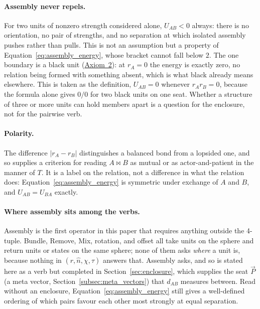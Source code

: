 \documentclass[12pt, a4paper]{article}
\begin{document}
\paragraph{Assembly never repels.}
For two units of nonzero strength considered alone, $U_{AB}<0$
always: there is no orientation, no pair of strengths, and no
separation at which isolated assembly pushes rather than pulls. This
is not an assumption but a property of
Equation~\eqref{eq:assembly_energy}, whose bracket cannot fall below
$2$. The one boundary is a black unit
(\hyperref[subsec:axiom_null]{Axiom~2}): at $r_A=0$ the energy is exactly
zero, no relation being formed with something absent, which is what
black already means elsewhere. This is taken as the definition,
$U_{AB}=0$ whenever $r_Ar_B=0$, because the formula alone gives $0/0$
for two black units on one seat. Whether a structure of three or more
units can hold members apart is a question for the enclosure, not
for the pairwise verb.

\paragraph{Polarity.}
The difference $\lvert r_A - r_B\rvert$ distinguishes a balanced bond
from a lopsided one, and so supplies a criterion for reading
$A\bowtie B$ as mutual or as actor-and-patient in the manner of $T$.
It is a label on the relation, not a difference in what the relation
does: Equation~\eqref{eq:assembly_energy} is symmetric under exchange
of $A$ and $B$, and $U_{AB}=U_{BA}$ exactly.

\paragraph{Where assembly sits among the verbs.}
Assembly is the first operator in this paper that requires anything
outside the 4-tuple. Bundle, Remove, Mix, rotation, and offset all
take units on the sphere and return units or states on the same
sphere; none of them asks \emph{where} a unit is, because nothing in
$(r,\hat n,\chi,\tau)$ answers that. Assembly asks, and so is stated
here as a verb but completed in Section~\ref{sec:enclosure}, which
supplies the seat $\vec P$ (a meta vector, Section~\ref{subsec:meta_vectors})
that $d_{AB}$ measures between. Read
without an enclosure, Equation~\eqref{eq:assembly_energy} still
gives a well-defined ordering of which pairs favour each other most
strongly at equal separation.
\end{document}
